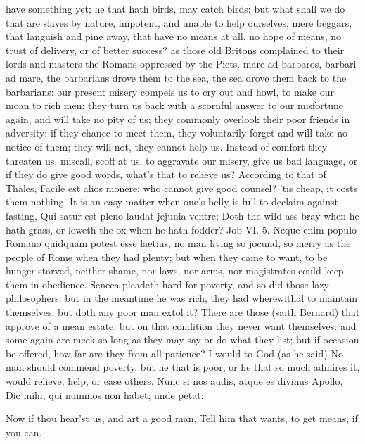 {have something yet; he that hath birds, may catch birds; but what shall
we do that are slaves by nature, impotent, and unable to help
ourselves, mere beggars, that languish and pine away, that have no
means at all, no hope of means, no trust of delivery, or of better
success? as those old Britons complained to their lords and masters the
Romans oppressed by the Picts. mare ad barbaros, barbari ad mare, the
barbarians drove them to the sea, the sea drove them back to the
barbarians: our present misery compels us to cry out and howl, to make
our moan to rich men: they turn us back with a scornful answer to our
misfortune again, and will take no pity of us; they commonly overlook
their poor friends in adversity; if they chance to meet them, they
voluntarily forget and will take no notice of them; they will not, they
cannot help us. Instead of comfort they threaten us, miscall, scoff at
us, to aggravate our misery, give us bad language, or if they do give
good words, what's that to relieve us? According to that of Thales,
Facile est alios monere; who cannot give good counsel? 'tis cheap, it
costs them nothing. It is an easy matter when one's belly is full to
declaim against fasting, Qui satur est pleno laudat jejunia ventre;
Doth the wild ass bray when he hath grass, or loweth the ox when he
hath fodder? Job VI. 5. Neque enim populo Romano quidquam potest
esse laetius, no man living so jocund, so merry as the people of Rome
when they had plenty; but when they came to want, to be hunger-starved,
neither shame, nor laws, nor arms, nor magistrates could keep them in
obedience. Seneca pleadeth hard for poverty, and so did those lazy
philosophers: but in the meantime he was rich, they had
wherewithal to maintain themselves; but doth any poor man extol it?
There are those (saith  Bernard) that approve of a mean estate,
but on that condition they never want themselves: and some again are
meek so long as they may say or do what they list; but if occasion be
offered, how far are they from all patience? I would to God (as he
said) No man should commend poverty, but he that is poor, or he
that so much admires it, would relieve, help, or ease others.
Nunc si nos audis, atque es divinus Apollo,
Dic mihi, qui nummos non habet, unde petat:

Now if thou hear'st us, and art a good man,
Tell him that wants, to get means, if you can.

}
